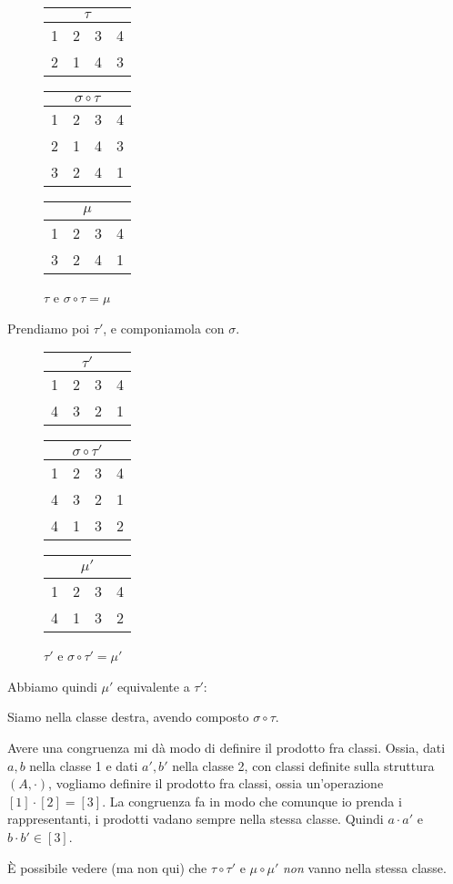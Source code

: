 \begin{exmp}
\begin{figure}[ht]
\centering
\begin{tabular}{cccc}
\multicolumn{4}{c}{$\tau$} \\
\hline
1 & 2 & 3 & 4 \\
2 & 1 & 4 & 3
\end{tabular}
\qquad
\begin{tabular}{cccc}
\multicolumn{4}{c}{$\sigma \circ \tau$} \\
\hline
1 & 2 & 3 & 4 \\
2 & 1 & 4 & 3 \\
3 & 2 & 4 & 1
\end{tabular}
\qquad
\begin{tabular}{cccc}
\multicolumn{4}{c}{$\mu$} \\
\hline
1 & 2 & 3 & 4 \\
3 & 2 & 4 & 1
\end{tabular}
\caption{$\tau$ e $\sigma \circ \tau = \mu$}
\end{figure}

Prendiamo poi $\tau'$, e componiamola con $\sigma$.

\begin{figure}[ht]
\centering
\begin{tabular}{cccc}
\multicolumn{4}{c}{$\tau'$} \\
\hline
1 & 2 & 3 & 4 \\
4 & 3 & 2 & 1
\end{tabular}
\qquad
\begin{tabular}{cccc}
\multicolumn{4}{c}{$\sigma \circ \tau'$} \\
\hline
1 & 2 & 3 & 4 \\
4 & 3 & 2 & 1 \\
4 & 1 & 3 & 2
\end{tabular}
\qquad
\begin{tabular}{cccc}
\multicolumn{4}{c}{$\mu'$} \\
\hline
1 & 2 & 3 & 4 \\
4 & 1 & 3 & 2
\end{tabular}
\caption{$\tau'$ e $\sigma \circ \tau' = \mu'$}
\end{figure}

Abbiamo quindi $\mu'$ equivalente a $\tau'$:

Siamo nella classe destra, avendo composto $\sigma \circ \tau$.

Avere una congruenza mi d\`a modo di definire il prodotto fra classi. Ossia, dati $a, b$ nella classe 1 e dati $a', b'$ nella classe 2, con classi definite sulla struttura $(A, \cdot)$, vogliamo definire il prodotto fra classi, ossia un'operazione $[1] \cdot [2] = [3]$.  La congruenza fa in modo che comunque io prenda i rappresentanti, i prodotti vadano sempre nella stessa classe. Quindi $a \cdot a'$ e $b \cdot b' \in [3]$.

\`E possibile vedere (ma non qui) che $\tau \circ \tau'$ e $\mu \circ \mu'$ \textit{non} vanno nella stessa classe.
\end{exmp}

